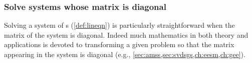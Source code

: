 \subsubsection{Solve systems whose matrix is diagonal}

Solving a system of s (\cref{def:lineqn}) is particularly straightforward when the matrix of the system is diagonal.
Indeed much mathematics in both theory and applications is devoted to transforming a given problem so that the matrix appearing in the  system is diagonal (e.g., \cref{sec:amss,sec:svdsgs,ch:eesm,ch:gee}).

\begin{comment}
Here prepare for using the \svd, but also use diagonal matrices to reinforce the translation to/from matrix and symbolic forms, and to reinforce zero, one, many solutions.
\end{comment}%


